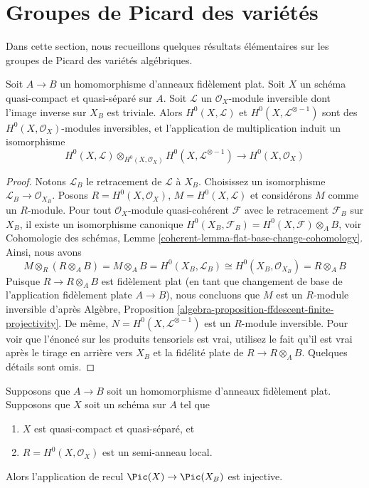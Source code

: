 \section{Groupes de Picard des variétés}
\label{section-picard-groups}

\noindent
Dans cette section, nous recueillons quelques résultats
élémentaires sur les groupes de Picard des variétés algébriques.

\begin{lemma}
\label{lemma-change-rings-pic-pre}
Soit $A \to B$ un homomorphisme d'anneaux fidèlement plat. Soit
$X$ un schéma quasi-compact et quasi-séparé sur $A$. Soit
$\mathcal{L}$ un $\mathcal{O}_X$-module inversible dont l'image
inverse sur $X_B$ est triviale. Alors $H^0(X, \mathcal{L})$ et $H^0(X,
\mathcal{L}^{\otimes -1})$ sont des $H^0(X, \mathcal{O}_X)$-modules
inversibles, et l'application de multiplication induit un isomorphisme
$$
H^0(X, \mathcal{L}) \otimes_{H^0(X, \mathcal{O}_X)}
H^0(X, \mathcal{L}^{\otimes -1}) \longrightarrow
H^0(X, \mathcal{O}_X)
$$
\end{lemma}

\begin{proof}
Notons $\mathcal{L}_B$ le retracement de $\mathcal{L}$ à
$X_B$. Choisissez un isomorphisme $\mathcal{L}_B \to
\mathcal{O}_{X_B}$. Posons $R = H^0(X, \mathcal{O}_X)$, $M =
H^0(X, \mathcal{L})$ et considérons $M$ comme un $R$-module.
Pour tout $\mathcal{O}_X$-module quasi-cohérent $\mathcal{F}$
avec le retracement $\mathcal{F}_B$ sur $X_B$, il existe un
isomorphisme canonique $H^0(X_B, \mathcal{F}_B) = H^0(X,
\mathcal{F}) \otimes_A B$, voir Cohomologie des schémas, Lemme
\ref{coherent-lemma-flat-base-change-cohomology}. Ainsi, nous avons
$$
M \otimes_R (R \otimes_A B) =
M \otimes_A B = H^0(X_B, \mathcal{L}_B) \cong
H^0(X_B, \mathcal{O}_{X_B}) = R \otimes_A B
$$
Puisque $R \to R \otimes_A B$ est fidèlement plat (en tant que
changement de base de l'application fidèlement plate $A \to B$), nous
concluons que $M$ est un $R$-module inversible d'après Algèbre,
Proposition \ref{algebra-proposition-ffdescent-finite-projectivity}.
De même, $N = H^0(X, \mathcal{L}^{\otimes -1})$ est un $R$-module
inversible. Pour voir que l'énoncé sur les produits tensoriels est vrai,
utilisez le fait qu'il est vrai après le tirage en arrière vers $X_B$ et
la fidélité plate de $R \to R \otimes_A B$. Quelques détails sont omis.
\end{proof}

\begin{lemma}
\label{lemma-change-rings-pic}
Supposons que $A \to B$ soit un homomorphisme d'anneaux
fidèlement plat. Supposons que $X$ soit un schéma sur $A$ tel que
\begin{enumerate}
\item $X$ est quasi-compact et quasi-séparé, et \item
$R = H^0(X, \mathcal{O}_X)$ est un semi-anneau local.
\end{enumerate}
Alors l'application de recul $\Pic(X) \to \Pic(X_B)$ est injective.
\end{lemma}

